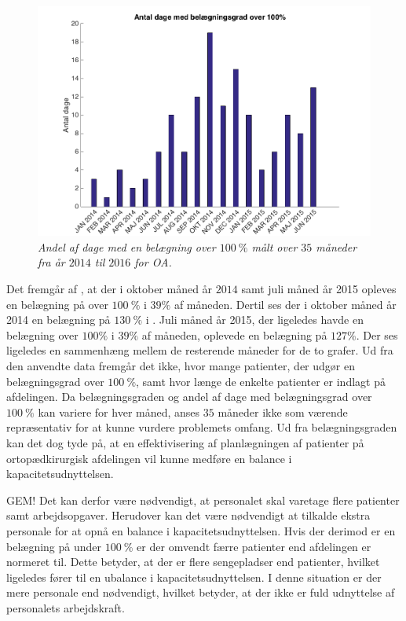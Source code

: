 \begin{figure}[H]
	\flushleft 
	\centering
	\includegraphics[scale=.4]{figures/antaldage.png}
	\flushleft
	\caption{\textit{Andel af dage med en belægning over $100~\%$ målt over $35$ måneder fra år $2014$ til $2016$ for OA.}\cite{SDS2015}}
	\label{antaldage}
\end{figure}

\noindent
Det fremgår af , at der i oktober måned år $2014$ samt juli måned år 2015 opleves en belægning på over $100~\%$ i $39\%$ af måneden. Dertil ses der i oktober måned år 2014 en belægning på $130~\%$ i . Juli måned år 2015, der ligeledes havde en belægning over $100\%$ i $39\%$ af måneden, oplevede en belægning på $127\%$. Der ses ligeledes en sammenhæng mellem de resterende måneder for de to grafer. 
Ud fra den anvendte data fremgår det ikke, hvor mange patienter, der udgør en belægningsgrad over $100~\%$, samt hvor længe de enkelte patienter er indlagt på afdelingen. Da belægningsgraden og andel af dage med belægningsgrad over $100~\%$ kan variere for hver måned, anses $35$ måneder ikke som værende repræsentativ for at kunne vurdere problemets omfang. Ud fra belægningsgraden kan det dog tyde på, at en effektivisering af planlægningen af patienter på ortopædkirurgisk afdelingen vil kunne medføre en balance i kapacitetsudnyttelsen.





GEM!
Det kan derfor være nødvendigt, at personalet skal varetage flere patienter samt arbejdsopgaver. Herudover kan det være nødvendigt at tilkalde ekstra personale for at opnå en balance i kapacitetsudnyttelsen.
Hvis der derimod er en belægning på under $100~\%$ er der omvendt færre patienter end afdelingen er normeret til. Dette betyder, at der er flere sengepladser end patienter, hvilket ligeledes fører til en ubalance i kapacitetsudnyttelsen. I denne situation er der mere personale end nødvendigt, hvilket betyder, at der ikke er fuld udnyttelse af personalets arbejdskraft.\cite{Pauly1986} 
